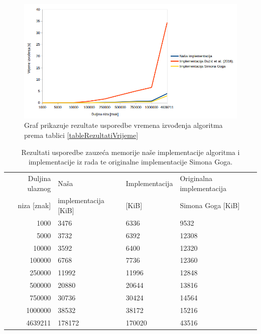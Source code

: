 \documentclass[times, utf8, seminar]{fer}
\begin{document}
\begin{figure}
 \begin{center}
 		\includegraphics[width=\columnwidth]{prvi.png}
 		\caption{Graf prikazuje rezultate usporedbe vremena izvođenja algoritma prema tablici \ref{tableRezultatiVrijeme}}
 		\label{fig:graf1}
 \end{center}
\end{figure}


\begin{table}
\caption{Rezultati usporedbe zauzeća memorije naše implementacije algoritma i implementacije iz rada \cite{studenti2016} te originalne implementacije Simona Goga.}
\label{tableRezultatiMemorija}
\begin{center}
\begin{tabular}{rlll}
\toprule
Duljina ulaznog & Naša & Implementacija & Originalna implementacija \\
niza   [znak] & implementacija [KiB] & \cite{studenti2016} [KiB] &  Simona Goga [KiB]\\
\midrule
1000 & 3476 & 6336 & 9532\\
5000 & 3732 &  6392 & 12308 \\
10000 & 3592 & 6400 & 12320 \\
100000 & 6768 & 7736 & 12360 \\
250000 & 11992 & 11996 & 12848 \\
500000 & 20880 & 20644 & 13816\\
750000 & 30736 & 30424 & 14564\\
1000000 & 38532 & 38172 & 15216 \\
4639211 & 178172 & 170020 & 43516\\
\bottomrule
\end{tabular}
\end{center}
\end{table}
\end{document}
